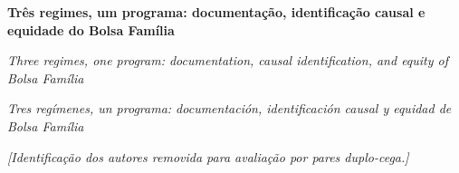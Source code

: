 \documentclass[12pt,a4paper,oneside]{article}
\begin{document}
\begin{center}{\LARGE\bfseries Três regimes, um programa: documentação, identificação causal e equidade do Bolsa Família\par}\end{center}

\begin{center}{\large\itshape Three regimes, one program: documentation, causal identification, and equity of Bolsa Família\par}\end{center}

\begin{center}{\large\itshape Tres regímenes, un programa: documentación, identificación causal y equidad de Bolsa Família\par}\end{center}













\vspace{6pt}



\begin{center}{\footnotesize\itshape [Identificação dos autores removida para avaliação por pares duplo-cega.]\par}\end{center}
\end{document}
